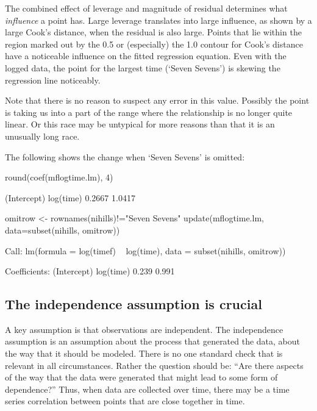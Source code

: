The combined
effect of leverage and magnitude of residual determines
what {\em influence} a point has.  Large leverage translates into
large influence, as shown by a large Cook's distance, when the
residual is also large.  Points that lie within the region marked out
by the 0.5 or (especially) the 1.0 contour for Cook's distance have a
noticeable influence on the fitted regression equation.  Even with the
logged data, the point for the largest time (`Seven Sevens') is
skewing the regression line noticeably.

Note that there is no reason to suspect any error in this value.  Possibly
the point is taking us into a part of the range where the relationship
is no longer quite linear.  Or this race may be untypical for more
reasons than that it is an unusually long race.

The following shows the change when `Seven Sevens' is omitted:
\begin{Schunk}
\begin{Sinput}
round(coef(mflogtime.lm), 4)
\end{Sinput}
\begin{Soutput}
(Intercept)   log(time) 
     0.2667      1.0417 
\end{Soutput}
\begin{Sinput}
omitrow <- rownames(nihills)!="Seven Sevens"
update(mflogtime.lm, data=subset(nihills, omitrow))
\end{Sinput}
\begin{Soutput}

Call:
lm(formula = log(timef) ~ log(time), data = subset(nihills, omitrow))

Coefficients:
(Intercept)    log(time)  
      0.239        0.991  
\end{Soutput}
\end{Schunk}

 \subsection{The independence assumption is crucial}

 A key assumption is that observations are independent.  The
 independence assumption is an assumption about the process that
 generated the data, about the way that it should be modeled.
 There is no one standard check that is relevant in all circumstances.
 Rather the question should be: ``Are there aspects of the way that
 the data were generated that might lead to some form of dependence?''
 Thus, when data are collected over time, there may be a time series
 correlation between points that are close together in time.

